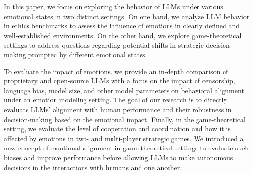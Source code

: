 \documentclass{article}
\begin{document}

In this paper, we focus on exploring the behavior of LLMs under various emotional states in two distinct settings. On one hand, we analyze LLM behavior in ethics benchmarks to assess the influence of emotions in clearly defined and well-established environments. On the other hand, we explore game-theoretical settings to address questions regarding potential shifts in strategic decision-making prompted by different emotional states.



To evaluate the impact of emotions, we provide an in-depth comparison of proprietary and open-source LLMs with a focus on the impact of censorship, language bias,
model size, and other model parameters on behavioral alignment under an emotion modeling setting.  The goal of our research is to directly evaluate LLMs' alignment with human performance and their robustness in decision-making based on the emotional impact. Finally, in the game-theoretical setting, we evaluate the level of cooperation and coordination and how it is affected by emotions in two- and multi-player strategic games. We introduced a new concept of emotional alignment in game-theoretical settings to evaluate such biases and improve performance before allowing LLMs to make autonomous decisions in the interactions with humans and one another.



\end{document}
